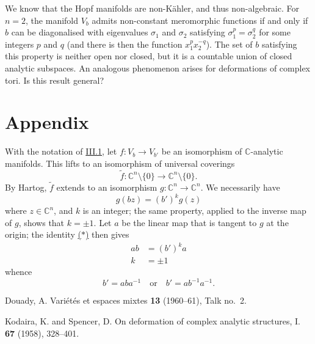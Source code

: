 \documentclass{article}
\newcommand{\CC}{\mathbb{C}}
\begin{document}
We know that the Hopf manifolds are non-K\"{a}hler, and thus non-algebraic.
For $n=2$, the manifold $V_b$ admits non-constant meromorphic functions if and only if $b$ can be diagonalised with eigenvalues $\sigma_1$ and $\sigma_2$ satisfying $\sigma_1^p=\sigma_2^q$ for some integers $p$ and $q$ (and there is then the function $x_1^px_2^{-q}$).
The set of $b$ satisfying this property is neither open nor closed, but it is a countable union of closed analytic subspaces.
An analogous phenomenon arises for deformations of complex tori.
Is this result general?


\appendix
{}
\section*{Appendix}
\label{appendix}

With the notation of \hyperref[III.1]{III.1}, let $f\colon V_b\to V_{b'}$ be an isomorphism of $\CC$-analytic manifolds.
This lifts to an isomorphism of universal coverings
\[
  \widetilde{f}\colon \CC^n\setminus\{0\} \to \CC^n\setminus\{0\}.
\]
By Hartog, $\widetilde{f}$ extends to an isomorphism $g\colon\CC^n\to\CC^n$.
We necessarily have
\[
\label{*}
  g(bz) = (b')^kg(z)
\tag{$*$}
\]
where $z\in\CC^n$, and $k$ is an integer;
the same property, applied to the inverse map of $g$, shows that $k=\pm1$.
Let $a$ be the linear map that is tangent to $g$ at the origin;
the identity \hyperref[*]{($*$)} then gives
\[
  \begin{aligned}
    ab &= (b')^ka
  \\k &= \pm1
  \end{aligned}
\]
whence
\[
  b' = aba^{-1}
  \quad\text{or}\quad
  b'= ab^{-1}a^{-1}.
\]






\nocite{*}

\begin{thebibliography}{2}

  {\sc Douady, A.}
  \newblock Vari\'{e}t\'{e}s et espaces mixtes
   \textbf{13} (1960--61), Talk no.~2.

  {\sc Kodaira, K. and Spencer, D.}
  \newblock On deformation of complex analytic structures, I.
   \textbf{67} (1958), 328--401.

\end{thebibliography}
\end{document}
